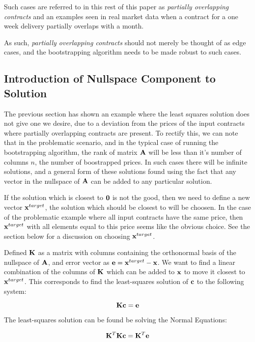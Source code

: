 \documentclass{article}
\begin{document}
Such cases are referred to in this rest of this paper as \emph{partially overlapping contracts}
and an examples seen in real market data when a contract for a one week delivery partially
overlaps with a month.

As such, \emph{partially overlapping contracts} should not merely be 
thought of as edge cases, and the bootstrapping algorithm needs to be made robust to
such cases.


\subsection{Introduction of Nullspace Component to Solution}
The previous section has shown an example where the least squares solution does 
not give one we desire, due to a deviation from the prices of the input contracts
where partially overlapping contracts are present.
To rectify this, we can note that in the problematic scenario, and in the typical
case of running the bootstrapping algorithm, the rank of matrix $\mathbf{A}$ will be
less than it's number of columns $n$, the number of boostrapped prices. In such
cases there will be infinite solutions, and a general form of these solutions found
using the fact that any vector in the nullspace of $\mathbf{A}$ can be added to any
particular solution.

\bigskip

If the solution which is closest to $\mathbf{0}$ is not the good, then we need to define
a new vector $\mathbf{x}^{target}$, the solution which should be closest to will be choosen.
In the case of the problematic example where all input contracts have the same price,
then $\mathbf{x}^{target}$ with all elements equal to this price seems like the obvious choice.
See the section below for a discussion on choosing $\mathbf{x}^{target}$.

\bigskip

Defined $\mathbf{K}$ as a matrix with columns containing the orthonormal basis of the nullspace
of $\mathbf{A}$, and error vector as $\mathbf{e} = \mathbf{x}^{target} - \mathbf{x}$. We want to find a linear combination
of the columns of $\mathbf{K}$ which can be added to $\mathbf{x}$ to move it closest to $\mathbf{x}^{target}$.
This corresponds to find the least-squares solution of $\mathbf{c}$ to the following system:

\begin{equation}
    \mathbf{K}\mathbf{c} = \mathbf{e}
\end{equation}

The least-squares solution can be found be solving the Normal Equations:

\begin{equation}
    \mathbf{K}^T \mathbf{K} \mathbf{c} = \mathbf{K}^T \mathbf{e}
\end{equation}
\end{document}
